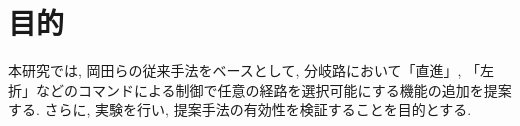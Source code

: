 
\section{目的}
本研究では, 岡田らの従来手法をベースとして, 分岐路において「直進」, 「左折」などのコマンドによる制御で任意の経路を選択可能にする機能の追加を提案する. さらに, 実験を行い, 提案手法の有効性を検証することを目的とする.


